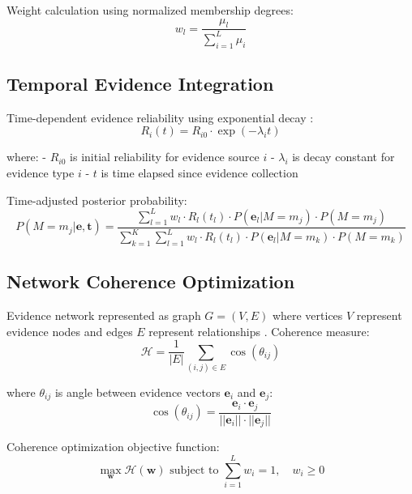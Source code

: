 \documentclass[12pt,a4paper]{article}
\begin{document}
Weight calculation using normalized membership degrees:
\begin{equation}
w_l = \frac{\mu_l}{\sum_{i=1}^L \mu_i}
\end{equation}

\subsection{Temporal Evidence Integration}

Time-dependent evidence reliability using exponential decay \cite{cox1962renewal}:
\begin{equation}
R_i(t) = R_{i0} \cdot \exp(-\lambda_i t)
\end{equation}

where:
- $R_{i0}$ is initial reliability for evidence source $i$
- $\lambda_i$ is decay constant for evidence type $i$
- $t$ is time elapsed since evidence collection

Time-adjusted posterior probability:
\begin{equation}
P(M = m_j | \mathbf{e}, \mathbf{t}) = \frac{\sum_{l=1}^L w_l \cdot R_l(t_l) \cdot P(\mathbf{e}_l | M = m_j) \cdot P(M = m_j)}{\sum_{k=1}^K \sum_{l=1}^L w_l \cdot R_l(t_l) \cdot P(\mathbf{e}_l | M = m_k) \cdot P(M = m_k)}
\end{equation}

\subsection{Network Coherence Optimization}

Evidence network represented as graph $G = (V, E)$ where vertices $V$ represent evidence nodes and edges $E$ represent relationships \cite{newman2003structure}. Coherence measure:
\begin{equation}
\mathcal{H} = \frac{1}{|E|} \sum_{(i,j) \in E} \cos(\theta_{ij})
\end{equation}

where $\theta_{ij}$ is angle between evidence vectors $\mathbf{e}_i$ and $\mathbf{e}_j$:
\begin{equation}
\cos(\theta_{ij}) = \frac{\mathbf{e}_i \cdot \mathbf{e}_j}{||\mathbf{e}_i|| \cdot ||\mathbf{e}_j||}
\end{equation}

Coherence optimization objective function:
\begin{equation}
\max_{\mathbf{w}} \mathcal{H}(\mathbf{w}) \text{ subject to } \sum_{i=1}^L w_i = 1, \quad w_i \geq 0
\end{equation}
\end{document}
